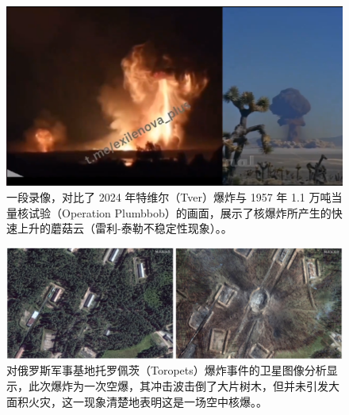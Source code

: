 \documentclass[10pt,twocolumn,letterpaper]{article}
\begin{document}
\begin{figure}[t]
\begin{center}
\includegraphics[width=1\textwidth]{tver.png}
\end{center}
   \caption{一段录像，对比了 2024 年特维尔（Tver）爆炸与 1957 年 1.1 万吨当量核试验（Operation Plumbbob）的画面，展示了核爆炸所产生的快速上升的蘑菇云（雷利-泰勒不稳定性现象）。\cite{24}。}
   \label{fig:12}
\end{figure}
\begin{figure}[t]
\begin{center}
\includegraphics[width=1\textwidth]{toropets.png}
\end{center}
   \caption{对俄罗斯军事基地托罗佩茨（Toropets）爆炸事件的卫星图像分析显示，此次爆炸为一次空爆，其冲击波击倒了大片树木，但并未引发大面积火灾，这一现象清楚地表明这是一场空中核爆。\cite{24}。}
   \label{fig:13}
\end{figure}
\end{document}
